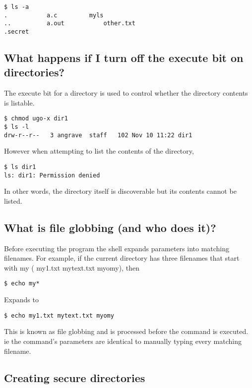 \begin{lstlisting}
$ ls -a
.           a.c         myls
..          a.out           other.txt
.secret 
\end{lstlisting}

\subsection{What happens if I turn off the execute bit on directories?}\label{what-happens-if-i-turn-off-the-execute-bit-on-directories}

The execute bit for a directory is used to control whether the directory contents is listable.

\begin{lstlisting}
$ chmod ugo-x dir1
$ ls -l
drw-r--r--   3 angrave  staff   102 Nov 10 11:22 dir1
\end{lstlisting}

However when attempting to list the contents of the directory,

\begin{lstlisting}
$ ls dir1
ls: dir1: Permission denied
\end{lstlisting}

In other words, the directory itself is discoverable but its contents cannot be listed.

\subsection{What is file globbing (and who does it)?}\label{what-is-file-globbing-and-who-does-it}

Before executing the program the shell expands parameters into matching filenames. For example, if the current directory has three filenames that start with my ( my1.txt mytext.txt myomy), then

\begin{lstlisting}
$ echo my*
\end{lstlisting}

Expands to

\begin{lstlisting}
$ echo my1.txt mytext.txt myomy
\end{lstlisting}

This is known as file globbing and is processed before the command is executed. ie the command's parameters are identical to manually typing every matching filename.

\subsection{Creating secure directories}\label{creating-secure-directories}

